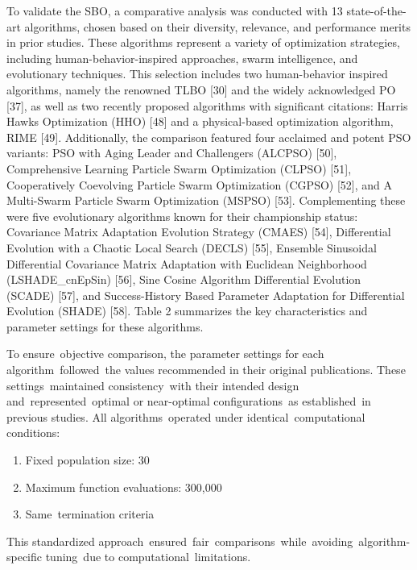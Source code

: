 \documentclass{article} %
\begin{document}
To validate the SBO, a comparative analysis was conducted with 13 state-of-the-art algorithms, chosen based on their diversity, relevance, and performance merits in prior studies. These algorithms represent a variety of optimization strategies, including human-behavior-inspired approaches, swarm intelligence, and evolutionary techniques. This selection includes two human-behavior inspired algorithms, namely the renowned TLBO [30] and the widely acknowledged PO [37], as well as two recently proposed algorithms with significant citations: Harris Hawks Optimization (HHO) [48] and a physical-based optimization algorithm, RIME [49]. Additionally, the comparison featured four acclaimed and potent PSO variants: PSO with Aging Leader and Challengers (ALCPSO) [50], Comprehensive Learning Particle Swarm Optimization (CLPSO) [51], Cooperatively Coevolving Particle Swarm Optimization (CGPSO) [52], and A Multi-Swarm Particle Swarm Optimization (MSPSO) [53]. Complementing these were five evolutionary algorithms known for their championship status: Covariance Matrix Adaptation Evolution Strategy (CMAES) [54], Differential Evolution with a Chaotic Local Search (DECLS) [55], Ensemble Sinusoidal Differential Covariance Matrix Adaptation with Euclidean Neighborhood (LSHADE\_cnEpSin) [56], Sine Cosine Algorithm Differential Evolution (SCADE) [57], and Success-History Based Parameter Adaptation for Differential Evolution (SHADE) [58]. Table 2 summarizes the key characteristics and parameter settings for these algorithms.

To ensure~objective comparison, the parameter settings for each algorithm~followed~the values recommended in their original publications. These settings~maintained consistency~with their intended design and~represented~optimal or near-optimal configurations~as established~in previous studies. All algorithms~operated under identical~computational conditions:

\begin{enumerate}
\item  Fixed population size: 30

\item  Maximum function evaluations: 300,000

\item  Same~termination criteria
\end{enumerate}

This standardized approach~ensured~fair~comparisons~while~avoiding~algorithm-specific tuning~due to computational~limitations.
\end{document}
